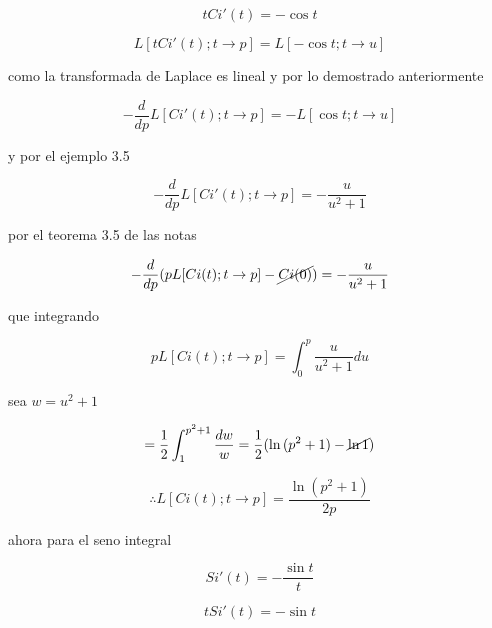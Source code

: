 \documentclass[12pt,a4paper]{article}
\begin{document}
\begin{enumerate}
    \begin{equation*}
        tCi'(t)=-\cos{t}
    \end{equation*}
    
    \begin{equation*}
        L[tCi'(t);t \rightarrow p]=L[-\cos{t};t \rightarrow u]
    \end{equation*}
    
    como la transformada de Laplace es lineal y por lo demostrado anteriormente
    
    \begin{equation*}
        -\frac{d}{dp}L[Ci'(t);t \rightarrow p]=-L[\cos{t};t \rightarrow u]
    \end{equation*}
    
    y por el ejemplo 3.5
    
    \begin{equation*}
        -\frac{d}{dp}L[Ci'(t);t \rightarrow p]=-\frac{u}{u^2+1}
    \end{equation*}
    
    por el teorema 3.5 de las notas
    
    \begin{equation*}
        -\frac{d}{dp}(pL[Ci(t);t \rightarrow p]-\cancel{Ci(0)})=-\frac{u}{u^2+1}
    \end{equation*}
    
    que integrando
    
    \begin{equation*}
        pL[Ci(t);t \rightarrow p]=\int_{0}^{p}\frac{u}{u^2+1} du
    \end{equation*}
    
    sea $w=u^2+1$
    
    \begin{equation*}
        =\frac{1}{2}\int_{1}^{p^2+1}\frac{dw}{w} =\frac{1}{2}(\ln{(p^2+1)}-\cancel{\ln{1}})
    \end{equation*}
    
    \begin{equation*}
        \therefore L[Ci(t);t \rightarrow p]=\frac{\ln{(p^2+1)}}{2p}
    \end{equation*}
    
    ahora para el seno integral
    
    \begin{equation*}
        Si'(t)=-\frac{\sin{t}}{t}
    \end{equation*}
    
    \begin{equation*}
        tSi'(t)=-\sin{t}
    \end{equation*}
    

\end{enumerate}
\end{document}
